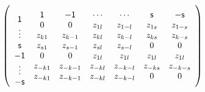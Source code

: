 \documentclass[aps,preprint]{revtex4}%
\begin{document}
\begin{equation}
\left(
\begin{array}
[c]{c}%
\\
\mathsf{1}\\
\vdots\\
\mathsf{s}\\
\mathsf{-1}\\
\vdots\\
\mathsf{-s}%
\end{array}%
\begin{array}
[c]{c}%
\mathsf{1}\\
0\\
z_{k1}\\
z_{s1}\\
0\\
z_{-k1}\\
z_{-k1}%
\end{array}%
\begin{array}
[c]{c}%
\mathsf{-1}\\
0\\
z_{k-1}\\
z_{s-1}\\
0\\
z_{-k-1}\\
z_{-k-1}%
\end{array}%
\begin{array}
[c]{c}%
\mathsf{\cdots}\\
z_{1l}\\
z_{kl}\\
z_{sl}\\
z_{1l}\\
z_{-kl}\\
z_{-kl}%
\end{array}%
\begin{array}
[c]{c}%
\mathsf{\cdots}\\
z_{1-l}\\
z_{k-l}\\
z_{s-l}\\
z_{1l}\\
z_{-k-l}\\
z_{-k-l}%
\end{array}%
\begin{array}
[c]{c}%
\mathsf{s}\\
z_{1s}\\
z_{ks}\\
0\\
z_{1l}\\
z_{-ks}\\
0
\end{array}%
\begin{array}
[c]{c}%
\mathsf{-s}\\
z_{1-s}\\
z_{k-s}\\
0\\
z_{1l}\\
z_{-k-s}\\
0
\end{array}
\right)
\end{equation}%
\end{document}
